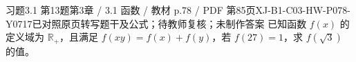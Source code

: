 \par\noindent\begin{minipage}{\linewidth}
\begin{bankitem}{习题3.1 第13题}{第3章 / 3.1 函数 / 教材 p.78 / PDF 第85页}{XJ-B1-C03-HW-P078-Y0717}{已对照原页转写题干及公式；待教师复核；未制作答案}
已知函数 $f(x)$ 的定义域为 $\mathbb R_+$，且满足 $f(xy)=f(x)+f(y)$，若 $f(27)=1$，求 $f(\sqrt3)$ 的值。
\end{bankitem}
\end{minipage}\par\medskip
